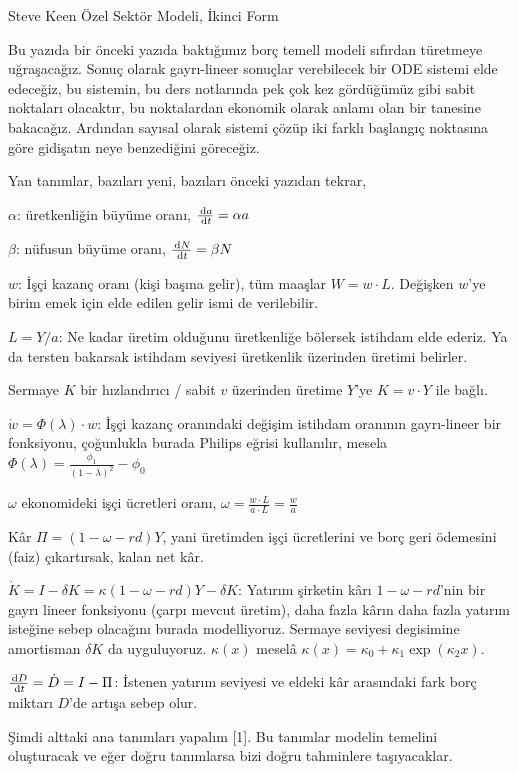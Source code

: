 \documentclass[12pt,fleqn]{article}\usepackage{../../common}
\begin{document}
Steve Keen Özel Sektör Modeli, İkinci Form

Bu yazıda bir önceki yazıda baktığımız borç temell modeli sıfırdan
türetmeye uğraşacağız. Sonuç olarak gayrı-lineer sonuçlar verebilecek bir
ODE sistemi elde edeceğiz, bu sistemin, bu ders notlarında pek çok kez
gördüğümüz gibi sabit noktaları olacaktır, bu noktalardan ekonomik olarak
anlamı olan bir tanesine bakacağız. Ardından sayısal olarak sistemi çözüp
iki farklı başlangıç noktasına göre gidişatın neye benzediğini göreceğiz.

Yan tanımlar, bazıları yeni, bazıları önceki yazıdan tekrar,

$\alpha$: üretkenliğin büyüme oranı, $\frac{\,\mathrm{d} a}{\,\mathrm{d} t} = \alpha a$

$\beta$: nüfusun büyüme oranı, $\frac{\,\mathrm{d} N}{\,\mathrm{d} t} = \beta N$

$w$: İşçi kazanç oranı (kişi başına gelir), tüm maaşlar $W = w \cdot
L$. Değişken $w$'ye birim emek için elde edilen gelir ismi de verilebilir.

$L = Y/a$: Ne kadar üretim olduğunu üretkenliğe bölersek istihdam elde
ederiz. Ya da tersten bakarsak istihdam seviyesi üretkenlik üzerinden
üretimi belirler.

Sermaye $K$ bir hızlandırıcı / sabit $v$ üzerinden üretime $Y$'ye
$K = v \cdot Y$ ile bağlı.

$\dot{w} = \Phi(\lambda) \cdot w$: İşçi kazanç oranındaki değişim istihdam
oranının gayrı-lineer bir fonksiyonu, çoğunlukla burada Philips eğrisi
kullanılır, mesela $\Phi(\lambda) = \frac{\phi_1}{(1-\lambda)^2}-\phi_0$

$\omega$ ekonomideki işçi ücretleri oranı, $\omega=\frac{w\cdot L}{a \cdot L} = \frac{w}{a}$

Kâr $\Pi = (1-\omega-rd)Y$, yani üretimden işçi ücretlerini ve borç geri
ödemesini (faiz) çıkartırsak, kalan net kâr. 

$\dot{K} = I - \delta K =\kappa(1 - \omega - rd) Y - \delta K$: Yatırım
şirketin kârı $1 - \omega - rd$'nin bir gayrı lineer fonksiyonu (çarpı
mevcut üretim), daha fazla kârın daha fazla yatırım isteğine sebep
olacağını burada modelliyoruz. Sermaye seviyesi degisimine amortisman
$\delta K$ da uyguluyoruz. $\kappa(x)$ meselâ
$\kappa(x) = \kappa_0 + \kappa_1 \exp(\kappa_2 x)$.

$\frac{\,\mathrm{d} D}{\,\mathrm{d} t} = \dot{D} = I - \Pi$: İstenen yatırım seviyesi ve
eldeki kâr arasındaki fark borç miktarı $D$'de artışa sebep olur.

Şimdi alttaki ana tanımları yapalım [1]. Bu tanımlar modelin temelini
oluşturacak ve eğer doğru tanımlarsa bizi doğru tahminlere taşıyacaklar.
\end{document}
